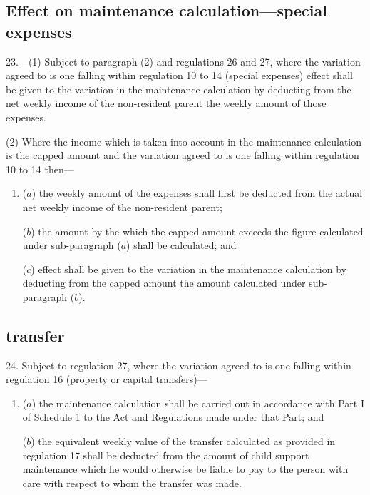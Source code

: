 \documentclass[12pt,a4paper]{article}
\begin{document}
\subsection[23. Effect on maintenance calculation—special expenses]{Effect on maintenance calculation—special expenses}

23.---(1)  Subject to paragraph (2) and regulations 26 and 27, where the variation agreed to is one falling within regulation 10 to 14 (special expenses) effect shall be given to the variation in the maintenance calculation by deducting from the net weekly income of the non-resident parent the weekly amount of those expenses.

(2) Where the income which is taken into account in the maintenance calculation is the capped amount and the variation agreed to is one falling within regulation 10 to 14 then—
\begin{enumerate}\item[]
($a$) the weekly amount of the expenses shall first be deducted from the actual net weekly income of the non-resident parent;

($b$) the amount by the which the capped amount exceeds the figure calculated under sub-paragraph ($a$)  shall be calculated; and

($c$) effect shall be given to the variation in the maintenance calculation by deducting from the capped amount the amount calculated under sub-paragraph ($b$).
\end{enumerate}

\subsection[24. Effect on maintenance calculation—property or capital transfer]{\sloppy {} transfer}

24.  Subject to regulation 27, where the variation agreed to is one falling within regulation 16 (property or capital transfers)—
\begin{enumerate}\item[]
($a$) the maintenance calculation shall be carried out in accordance with Part I of Schedule 1 to the Act and Regulations made under that Part; and

($b$) the equivalent weekly value of the transfer calculated as provided in regulation 17 shall be deducted from the amount of child support maintenance which he would otherwise be liable to pay to the person with care with respect to whom the transfer was made.
\end{enumerate}
\end{document}
